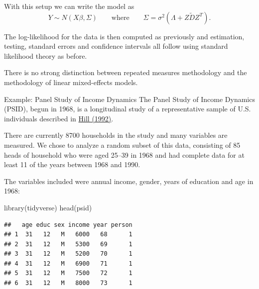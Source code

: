 \documentclass[
  ignorenonframetext,
]{beamer}
\newenvironment{Shaded}{\begin{snugshade}}{\end{snugshade}}
\newcommand{\FunctionTok}[1]{\textcolor[rgb]{0.00,0.00,0.00}{#1}}
\newcommand{\NormalTok}[1]{#1}
\begin{document}
\begin{frame}{}
\protect\hypertarget{section-18}{}
With this setup we can write the model as \[
  Y \sim N(X\beta, \Sigma) \qquad \text{where} \qquad \Sigma = \sigma^2(\Lambda + Z\tilde{D}Z^T).
\]

The log-likelihood for the data is then computed as previously and
estimation, testing, standard errors and confidence intervals all follow
using standard likelihood theory as before.

There is no strong distinction between repeated measures methodology and
the methodology of linear mixed-effects models.
\end{frame}

\begin{frame}[fragile]{Example: Panel Study of Income Dynamics}
\protect\hypertarget{example-panel-study-of-income-dynamics}{}
The Panel Study of Income Dynamics (PSID), begun in 1968, is a
longitudinal study of a representative sample of U.S. individuals
described in
\href{https://onesearch.library.rice.edu/discovery/fulldisplay?vid=01RICE_INST:RICE\&search_scope=MyInst_and_CI\&tab=Everything\&docid=alma991025907119705251\&lang=en\&context=L\&adaptor=Local\%20Search\%20Engine\&query=sub,exact,Famines,AND\&mode=advanced\&offset=0}{Hill
(1992)}.

There are currently 8700 households in the study and many variables are
measured. We chose to analyze a random subset of this data, consisting
of 85 heads of household who were aged 25--39 in 1968 and had complete
data for at least 11 of the years between 1968 and 1990.

The variables included were annual income, gender, years of education
and age in 1968:

\vspace{12pt}
\tiny

\begin{Shaded}
\begin{Highlighting}[]
\FunctionTok{library}\NormalTok{(tidyverse)}
\FunctionTok{head}\NormalTok{(psid)}
\end{Highlighting}
\end{Shaded}

\begin{verbatim}
##   age educ sex income year person
## 1  31   12   M   6000   68      1
## 2  31   12   M   5300   69      1
## 3  31   12   M   5200   70      1
## 4  31   12   M   6900   71      1
## 5  31   12   M   7500   72      1
## 6  31   12   M   8000   73      1
\end{verbatim}
\end{frame}
\end{document}
